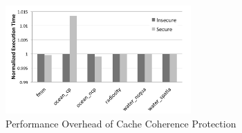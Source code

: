 \begin{figure}
    \begin{center}
        \includegraphics[width=2.79in]{figs/splash2.pdf}
        \caption{Performance Overhead of Cache Coherence Protection}
        \label{fig:splash2}
    \end{center}
\end{figure}
